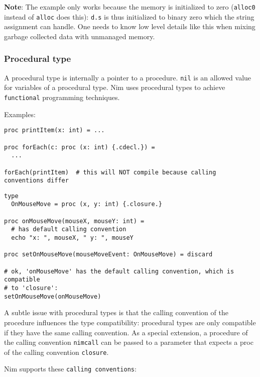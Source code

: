 \textbf{Note}: The example only works because the memory is initialized
to zero (\texttt{alloc0} instead of \texttt{alloc} does this):
\texttt{d.s} is thus initialized to binary zero which the string
assignment can handle. One needs to know low level details like this
when mixing garbage collected data with unmanaged memory.

\hypertarget{procedural-type}{%
\subsubsection{Procedural type}\label{procedural-type}}

A procedural type is internally a pointer to a procedure. \texttt{nil}
is an allowed value for variables of a procedural type. Nim uses
procedural types to achieve \texttt{functional} programming techniques.

Examples:

\begin{verbatim}
proc printItem(x: int) = ...

proc forEach(c: proc (x: int) {.cdecl.}) =
  ...

forEach(printItem)  # this will NOT compile because calling conventions differ
\end{verbatim}

\begin{verbatim}
type
  OnMouseMove = proc (x, y: int) {.closure.}

proc onMouseMove(mouseX, mouseY: int) =
  # has default calling convention
  echo "x: ", mouseX, " y: ", mouseY

proc setOnMouseMove(mouseMoveEvent: OnMouseMove) = discard

# ok, 'onMouseMove' has the default calling convention, which is compatible
# to 'closure':
setOnMouseMove(onMouseMove)
\end{verbatim}

A subtle issue with procedural types is that the calling convention of
the procedure influences the type compatibility: procedural types are
only compatible if they have the same calling convention. As a special
extension, a procedure of the calling convention \texttt{nimcall} can be
passed to a parameter that expects a proc of the calling convention
\texttt{closure}.

Nim supports these \texttt{calling\ conventions}:

